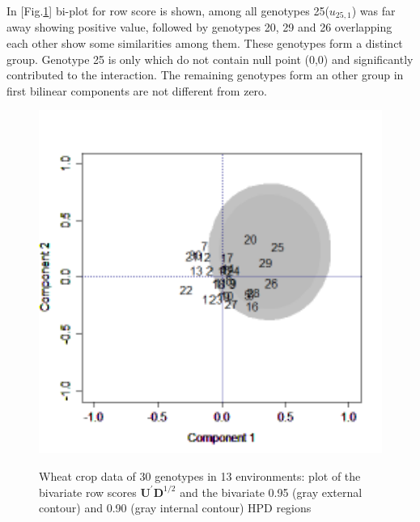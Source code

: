In [Fig.\ref{Figure:4.14}] bi-plot for row score is shown, among all genotypes 25($u_{25,1}$) was far away  showing positive value, followed by genotypes 20, 29 and 26 overlapping each other show some similarities among them. These genotypes form a distinct group. Genotype 25 is only which do not contain null point (0,0) and significantly contributed to the interaction. The remaining genotypes form an other group in first bilinear components are not different from zero.
\begin{figure} [H]
  
	\scalebox{0.3}
	{\includegraphics[width=550mm]{02ThesisMain/Ch04RD/figures/r-biplot-80-90.pdf}}
	\caption[Bayesian biplot for genotypes]{Wheat crop data of 30 genotypes in 13 environments: plot of the bivariate row scores $\textbf{U}^\prime\textbf{D}^{1/2}$ and the bivariate 0.95 (gray external contour) and 0.90 (gray internal contour) HPD regions}
\label{Figure:4.14}
\end{figure}


